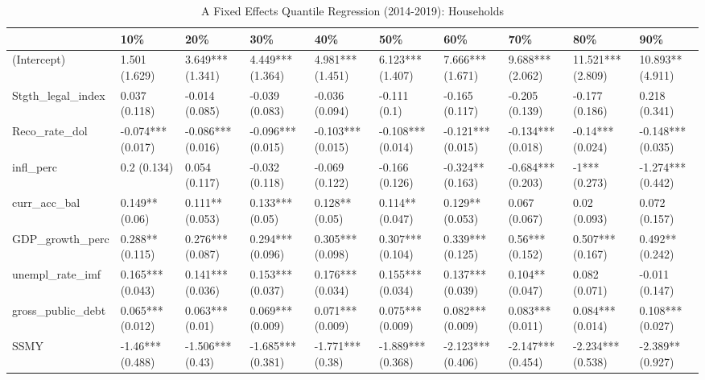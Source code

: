 \begin{table}[ht]
\centering
\caption{A Fixed Effects Quantile Regression (2014-2019): Households} 
\begingroup\small
\begin{tabular}{llllllllll}
  \toprule
 & 10\% & 20\% & 30\% & 40\% & 50\% & 60\% & 70\% & 80\% & 90\% \\ 
  \midrule
(Intercept) & 1.501 (1.629) & 3.649*** (1.341) & 4.449*** (1.364) & 4.981*** (1.451) & 6.123*** (1.407) & 7.666*** (1.671) & 9.688*** (2.062) & 11.521*** (2.809) & 10.893** (4.911) \\ 
  Stgth\_legal\_index & 0.037 (0.118) & -0.014 (0.085) & -0.039 (0.083) & -0.036 (0.094) & -0.111 (0.1) & -0.165 (0.117) & -0.205 (0.139) & -0.177 (0.186) & 0.218 (0.341) \\ 
  Reco\_rate\_dol & -0.074*** (0.017) & -0.086*** (0.016) & -0.096*** (0.015) & -0.103*** (0.015) & -0.108*** (0.014) & -0.121*** (0.015) & -0.134*** (0.018) & -0.14*** (0.024) & -0.148*** (0.035) \\ 
  infl\_perc & 0.2 (0.134) & 0.054 (0.117) & -0.032 (0.118) & -0.069 (0.122) & -0.166 (0.126) & -0.324** (0.163) & -0.684*** (0.203) & -1*** (0.273) & -1.274*** (0.442) \\ 
  curr\_acc\_bal & 0.149** (0.06) & 0.111** (0.053) & 0.133*** (0.05) & 0.128** (0.05) & 0.114** (0.047) & 0.129** (0.053) & 0.067 (0.067) & 0.02 (0.093) & 0.072 (0.157) \\ 
  GDP\_growth\_perc & 0.288** (0.115) & 0.276*** (0.087) & 0.294*** (0.096) & 0.305*** (0.098) & 0.307*** (0.104) & 0.339*** (0.125) & 0.56*** (0.152) & 0.507*** (0.167) & 0.492** (0.242) \\ 
  unempl\_rate\_imf & 0.165*** (0.043) & 0.141*** (0.036) & 0.153*** (0.037) & 0.176*** (0.034) & 0.155*** (0.034) & 0.137*** (0.039) & 0.104** (0.047) & 0.082 (0.071) & -0.011 (0.147) \\ 
  gross\_public\_debt & 0.065*** (0.012) & 0.063*** (0.01) & 0.069*** (0.009) & 0.071*** (0.009) & 0.075*** (0.009) & 0.082*** (0.009) & 0.083*** (0.011) & 0.084*** (0.014) & 0.108*** (0.027) \\ 
  SSMY & -1.46*** (0.488) & -1.506*** (0.43) & -1.685*** (0.381) & -1.771*** (0.38) & -1.889*** (0.368) & -2.123*** (0.406) & -2.147*** (0.454) & -2.234*** (0.538) & -2.389** (0.927) \\ 
   \bottomrule
\end{tabular}
\endgroup
\end{table}
